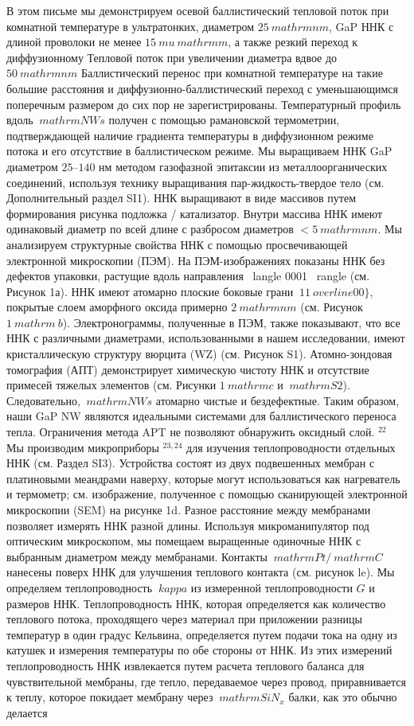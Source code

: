 \documentclass[a4paper, 12pt]{article}%
\begin{document}
В этом письме мы демонстрируем осевой баллистический тепловой поток при комнатной температуре в ультратонких, диаметром $ 25 \ mathrm {nm} $, GaP ННК с длиной проволоки не менее $ 15 \ mu \ mathrm {m} $, а также резкий переход к диффузионному Тепловой поток при увеличении диаметра вдвое до $ 50 \ mathrm {nm} $ Баллистический перенос при комнатной температуре на такие большие расстояния и диффузионно-баллистический переход с уменьшающимся поперечным размером до сих пор не зарегистрированы. Температурный профиль вдоль $ \ mathrm {NWs} $ получен с помощью рамановской термометрии, подтверждающей наличие градиента температуры в диффузионном режиме потока и его отсутствие в баллистическом режиме. Мы выращиваем ННК GaP диаметром $ 25–140 $ нм методом газофазной эпитаксии из металлоорганических соединений, используя технику выращивания пар-жидкость-твердое тело (см. Дополнительный раздел SI1). ННК выращивают в виде массивов путем формирования рисунка подложка / катализатор. Внутри массива ННК имеют одинаковый диаметр по всей длине с разбросом диаметров $ <5 \ mathrm {nm} $. Мы анализируем структурные свойства ННК с помощью просвечивающей электронной микроскопии (ПЭМ). На ПЭМ-изображениях показаны ННК без дефектов упаковки, растущие вдоль направления \ langle 0001 \ rangle (см. Рисунок 1а). ННК имеют атомарно плоские боковые грани $ \ 11 \ overline {0} 0 \} $, покрытые слоем аморфного оксида примерно $ 2 \ mathrm {nm} $ (см. Рисунок $ 1 \ mathrm {~ b} $). Электронограммы, полученные в ПЭМ, также показывают, что все ННК с различными диаметрами, использованными в нашем исследовании, имеют кристаллическую структуру вюрцита (WZ) (см. Рисунок S1). Атомно-зондовая томография (АПТ) демонстрирует химическую чистоту ННК и отсутствие примесей тяжелых элементов (см. Рисунки $ 1 \ mathrm {c} $ и $ \ mathrm {S} 2 $). Следовательно, $ \ mathrm {NWs} $ атомарно чистые и бездефектные. Таким образом, наши GaP NW являются идеальными системами для баллистического переноса тепла. Ограничения метода APT не позволяют обнаружить оксидный слой. $ {} ^ {22} $ Мы производим микроприборы $ {} ^ {23,24} $ для изучения теплопроводности отдельных ННК (см. Раздел SI3). Устройства состоят из двух подвешенных мембран с платиновыми меандрами наверху, которые могут использоваться как нагреватель и термометр; см. изображение, полученное с помощью сканирующей электронной микроскопии (SEM) на рисунке 1d. Разное расстояние между мембранами позволяет измерять ННК разной длины. Используя микроманипулятор под оптическим микроскопом, мы помещаем выращенные одиночные ННК с выбранным диаметром между мембранами. Контакты $ \ mathrm {Pt} / \ mathrm {C} $ нанесены поверх ННК для улучшения теплового контакта (см. рисунок le). Мы определяем теплопроводность $ \ kappa $ из измеренной теплопроводности $ G $ и размеров ННК. Теплопроводность ННК, которая определяется как количество теплового потока, проходящего через материал при приложении разницы температур в один градус Кельвина, определяется путем подачи тока на одну из катушек и измерения температуры по обе стороны от ННК. Из этих измерений теплопроводность ННК извлекается путем расчета теплового баланса для чувствительной мембраны, где тепло, передаваемое через провод, приравнивается к теплу, которое покидает мембрану через $ \ mathrm {SiN} _ {x} $ балки, как это обычно делается 
\end{document}
